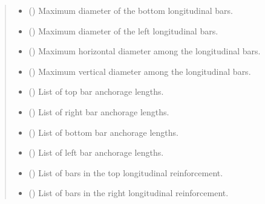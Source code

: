 \documentclass[a4paper,10pt,english]{sphinxmanual}
\begin{document}
\begin{fulllineitems}
\begin{quote}
\begin{description}
\begin{itemize}
\item {} 
\sphinxAtStartPar
{} () \textendash{} Maximum diameter of the bottom longitudinal bars.

\item {} 
\sphinxAtStartPar
{} () \textendash{} Maximum diameter of the left longitudinal bars.

\item {} 
\sphinxAtStartPar
{} () \textendash{} Maximum horizontal diameter among the longitudinal bars.

\item {} 
\sphinxAtStartPar
{} () \textendash{} Maximum vertical diameter among the longitudinal bars.

\item {} 
\sphinxAtStartPar
{} () \textendash{} List of top bar anchorage lengths.

\item {} 
\sphinxAtStartPar
{} () \textendash{} List of right bar anchorage lengths.

\item {} 
\sphinxAtStartPar
{} () \textendash{} List of bottom bar anchorage lengths.

\item {} 
\sphinxAtStartPar
{} () \textendash{} List of left bar anchorage lengths.

\item {} 
\sphinxAtStartPar
{} () \textendash{} List of bars in the top longitudinal reinforcement.

\item {} 
\sphinxAtStartPar
{} () \textendash{} List of bars in the right longitudinal reinforcement.


\end{itemize}
\end{description}
\end{quote}
\end{fulllineitems}
\end{document}

